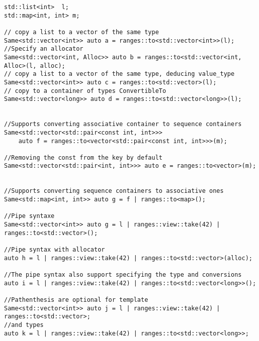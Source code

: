 \documentclass{wg21}
\begin{document}
\begin{verbatim}
std::list<int>  l;
std::map<int, int> m;

// copy a list to a vector of the same type
Same<std::vector<int>> auto a = ranges::to<std::vector<int>>(l);
//Specify an allocator
Same<std::vector<int, Alloc>> auto b = ranges::to<std::vector<int, Alloc>(l, alloc);
// copy a list to a vector of the same type, deducing value_type
Same<std::vector<int>> auto c = ranges::to<std::vector>(l);
// copy to a container of types ConvertibleTo
Same<std::vector<long>> auto d = ranges::to<std::vector<long>>(l);


//Supports converting associative container to sequence containers
Same<std::vector<std::pair<const int, int>>>
	auto f = ranges::to<vector<std::pair<const int, int>>>(m);

//Removing the const from the key by default
Same<std::vector<std::pair<int, int>>> auto e = ranges::to<vector>(m);


//Supports converting sequence containers to associative ones
Same<std::map<int, int>> auto g = f | ranges::to<map>();

//Pipe syntaxe
Same<std::vector<int>> auto g = l | ranges::view::take(42) | ranges::to<std::vector>();

//Pipe syntax with allocator
auto h = l | ranges::view::take(42) | ranges::to<std::vector>(alloc);

//The pipe syntax also support specifying the type and conversions
auto i = l | ranges::view::take(42) | ranges::to<std::vector<long>>();

//Pathenthesis are optional for template
Same<std::vector<int>> auto j = l | ranges::view::take(42) | ranges::to<std::vector>;
//and types
auto k = l | ranges::view::take(42) | ranges::to<std::vector<long>>;

\end{verbatim}

\pagebreak
\end{document}
